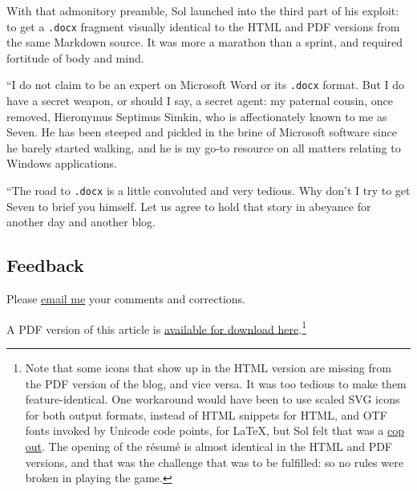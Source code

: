 \documentclass[
  british,
  a4paper,
  rgb,
  dvipsnames,
  svgnames,
  hyphens]{article}
\begin{document}
With that admonitory preamble, Sol launched into the third part of his
exploit: to get a \texttt{.docx} fragment visually identical to the HTML
and PDF versions from the same Markdown source. It was more a marathon
than a sprint, and required fortitude of body and mind.

``I do not claim to be an expert on Microsoft Word or its \texttt{.docx}
format. But I do have a secret weapon, or should I say, a secret agent:
my paternal cousin, once removed, Hieronymus Septimus Simkin, who is
affectionately known to me as Seven. He has been steeped and pickled in
the brine of Microsoft software since he barely started walking, and he
is my go-to resource on all matters relating to Windows applications.

``The road to \texttt{.docx} is a little convoluted and very tedious.
Why don't I try to get Seven to brief you himself. Let us agree to hold
that story in abeyance for another day and another blog.

\hypertarget{feedback}{%
\subsection{Feedback}\label{feedback}}

Please \href{mailto:feedback.swanlotus@gmail.com}{email me} your
comments and corrections.

\noindent A PDF version of this article is
\href{./using-font-awesome.pdf}{available for download here}.\footnote{Note
  that some icons that show up in the HTML version are missing from the
  PDF version of the blog, and vice versa. It was too tedious to make
  them feature-identical. One workaround would have been to use scaled
  SVG icons for both output formats, instead of HTML snippets for HTML,
  and OTF fonts invoked by Unicode code points, for LaTeX, but Sol felt
  that was a \href{https://www.thefreedictionary.com/cop+out}{cop out}.
  The opening of the résumé is almost identical in the HTML and PDF
  versions, and that was the challenge that was to be fulfilled: so no
  rules were broken in playing the game.  \normalfont}
\end{document}
